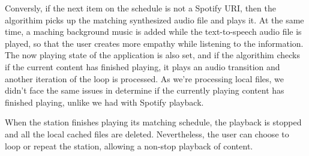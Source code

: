 Conversly, if the next item on the schedule is not a Spotify \ac{URI}, then the algorithim picks up the matching synthesized audio file and plays it. At the same time, a maching background music is added while the text-to-speech audio file is played, so that the user creates more empathy while listening to the information. The now playing state of the application is also set, and if the algorithim checks if the current content has finished playing, it plays an audio transition and another iteration of the loop is processed. As we're processing local files, we didn't face the same issues in determine if the currently playing content has finished playing, unlike we had with Spotify playback.

When the station finishes playing its matching schedule, the playback is stopped and all the local cached files are deleted. Nevertheless, the user can choose to loop or repeat the station, allowing a non-stop playback of content.

